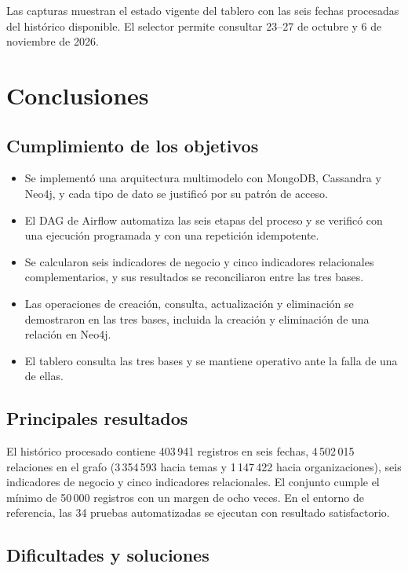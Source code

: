 \documentclass[11pt,a4paper]{article}
\begin{document}
Las capturas muestran el estado vigente del tablero con las seis fechas procesadas del histórico disponible. El selector permite consultar 23–27 de octubre y 6 de noviembre de 2026.

\section{Conclusiones}\label{sec:conclusiones}

\subsection{Cumplimiento de los objetivos}

\begin{itemize}
    \item Se implementó una arquitectura multimodelo con MongoDB, Cassandra y Neo4j, y cada tipo de dato se justificó por su patrón de acceso.
    \item El DAG de Airflow automatiza las seis etapas del proceso y se verificó con una ejecución programada y con una repetición idempotente.
    \item Se calcularon seis indicadores de negocio y cinco indicadores relacionales complementarios, y sus resultados se reconciliaron entre las tres bases.
    \item Las operaciones de creación, consulta, actualización y eliminación se demostraron en las tres bases, incluida la creación y eliminación de una relación en Neo4j.
    \item El tablero consulta las tres bases y se mantiene operativo ante la falla de una de ellas.
\end{itemize}

\subsection{Principales resultados}

El histórico procesado contiene 403\,941 registros en seis fechas, 4\,502\,015 relaciones en el grafo (3\,354\,593 hacia temas y 1\,147\,422 hacia organizaciones), seis indicadores de negocio y cinco indicadores relacionales. El conjunto cumple el mínimo de 50\,000 registros con un margen de ocho veces. En el entorno de referencia, las 34 pruebas automatizadas se ejecutan con resultado satisfactorio.

\subsection{Dificultades y soluciones}
\end{document}
